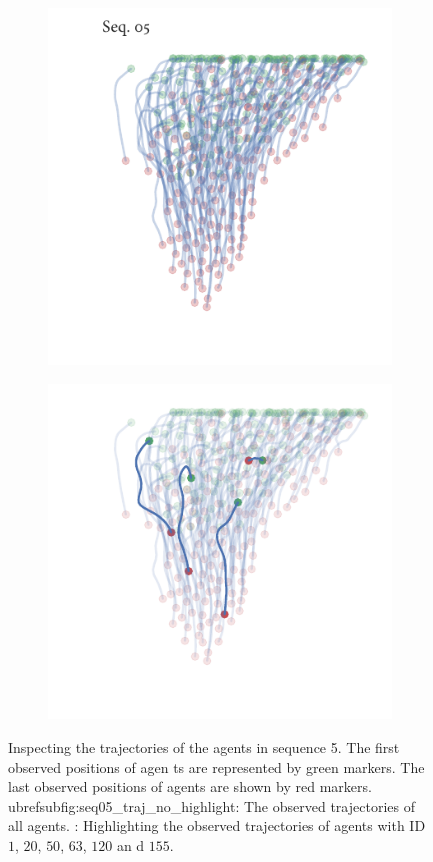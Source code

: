 \begin{figure}[!tbp]
	\begin{subfigure}[b]{0.5\textwidth}
		\centering
		\includegraphics{sequence05.pdf}
		\caption{}
		\label{subfig:seq05_traj_no_highlight}
	\end{subfigure}%
	\begin{subfigure}[b]{0.5\textwidth}
		\centering
		\includegraphics{sequence05_highlight.pdf}
		\caption{}
		\label{subfig:seq05_traj_highlight}
	\end{subfigure}
	\caption{Inspecting the trajectories of the agents in sequence 5. The first observed positions of agen
ts are represented by green markers. The last observed positions of agents are shown by red markers. \s
ubref{subfig:seq05_traj_no_highlight}: The observed trajectories of all agents. : Highlighting the observed trajectories of agents with ID $1$, $20$, $50$, $63$, $120$ an
d $155$.}
	\label{fig:seq05_traj}
\end{figure}

